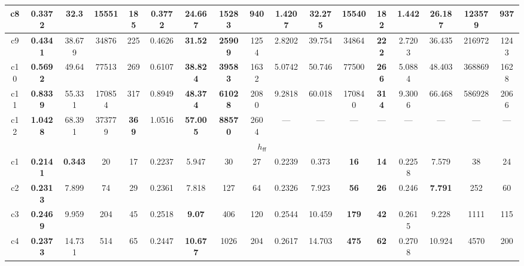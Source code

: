 \documentclass[landscape]{article}%
\begin{document}
\begin{tabular}{||c||c|c|c|c|c|c|c|c|c|c|c|c|c|c|c|c||}
\hline%
c8&\small{\textbf{0.3372}}&\small{32.3}&\small{15551}&\small{185}&\small{0.3772}&\small{\textbf{24.667}}&\small{\textbf{15283}}&\small{940}&\small{1.4207}&\small{32.275}&\small{15540}&\small{\textbf{182}}&\small{1.442}&\small{26.187}&\small{123579}&\small{937}\\%
\hline%
c9&\small{\textbf{0.4341}}&\small{38.679}&\small{34876}&\small{225}&\small{0.4626}&\small{\textbf{31.52}}&\small{\textbf{25909}}&\small{1254}&\small{2.8202}&\small{39.754}&\small{34864}&\small{\textbf{222}}&\small{2.7203}&\small{36.435}&\small{216972}&\small{1243}\\%
\hline%
c10&\small{\textbf{0.5692}}&\small{49.64}&\small{77513}&\small{269}&\small{0.6107}&\small{\textbf{38.824}}&\small{\textbf{39583}}&\small{1632}&\small{5.0742}&\small{50.746}&\small{77500}&\small{\textbf{266}}&\small{5.0884}&\small{48.403}&\small{368869}&\small{1628}\\%
\hline%
c11&\small{\textbf{0.8339}}&\small{55.331}&\small{170854}&\small{317}&\small{0.8949}&\small{\textbf{48.374}}&\small{\textbf{61028}}&\small{2080}&\small{9.2818}&\small{60.018}&\small{170840}&\small{\textbf{314}}&\small{9.3006}&\small{66.468}&\small{586928}&\small{2066}\\%
\hline%
c12&\small{\textbf{1.0428}}&\small{68.391}&\small{373779}&\small{\textbf{369}}&\small{1.0516}&\small{\textbf{57.005}}&\small{\textbf{88570}}&\small{2604}&\small{---}&\small{---}&\small{---}&\small{---}&\small{---}&\small{---}&\small{---}&\small{---}\\%
\hline%
\multicolumn{17}{||c||}{$h_{\mathsf{ff}}$}\\%
\hline%
c1&\small{\textbf{0.2141}}&\small{\textbf{0.343}}&\small{20}&\small{17}&\small{0.2237}&\small{5.947}&\small{30}&\small{27}&\small{0.2239}&\small{0.373}&\small{\textbf{16}}&\small{\textbf{14}}&\small{0.2258}&\small{7.579}&\small{38}&\small{24}\\%
\hline%
c2&\small{\textbf{0.2313}}&\small{7.899}&\small{74}&\small{29}&\small{0.2361}&\small{7.818}&\small{127}&\small{64}&\small{0.2326}&\small{7.923}&\small{\textbf{56}}&\small{\textbf{26}}&\small{0.246}&\small{\textbf{7.791}}&\small{252}&\small{60}\\%
\hline%
c3&\small{\textbf{0.2469}}&\small{9.959}&\small{204}&\small{45}&\small{0.2518}&\small{\textbf{9.07}}&\small{406}&\small{120}&\small{0.2544}&\small{10.459}&\small{\textbf{179}}&\small{\textbf{42}}&\small{0.2615}&\small{9.228}&\small{1111}&\small{115}\\%
\hline%
c4&\small{\textbf{0.2373}}&\small{14.731}&\small{514}&\small{65}&\small{0.2447}&\small{\textbf{10.677}}&\small{1026}&\small{204}&\small{0.2617}&\small{14.703}&\small{\textbf{475}}&\small{\textbf{62}}&\small{0.2708}&\small{10.924}&\small{4570}&\small{200}\\%

\end{tabular}
\end{document}
